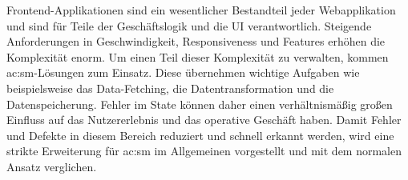 Frontend-Applikationen sind ein wesentlicher Bestandteil jeder Webapplikation und sind für Teile der Geschäftslogik und die UI verantwortlich. Steigende Anforderungen in Geschwindigkeit, Responsiveness und Features erhöhen die Komplexität enorm. Um einen Teil dieser Komplexität zu verwalten, kommen \acrlong{ac:sm}-Lösungen zum Einsatz. Diese übernehmen wichtige Aufgaben wie beispielsweise das Data-Fetching, die Datentransformation und die Datenspeicherung. Fehler im State können daher einen verhältnismäßig großen Einfluss auf das Nutzererlebnis und das operative Geschäft haben. Damit Fehler und Defekte in diesem Bereich reduziert und schnell erkannt werden, wird eine strikte Erweiterung für \acrlong{ac:sm} im Allgemeinen vorgestellt und mit dem normalen Ansatz verglichen.